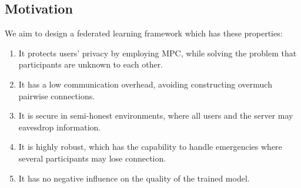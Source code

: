 
\subsection{Motivation} We aim to design a federated learning framework which has these properties:
\begin{enumerate}
    \item It protects users' privacy by employing MPC, while solving the problem that participants are unknown to each other.

    \item It has a low communication overhead, avoiding constructing overmuch pairwise connections.

    \item It is secure in semi-honest environments, where all users and the server may eavesdrop information.

    \item It is highly robust, which has the capability to handle emergencies where several participants may lose connection.

    \item It has no negative influence on the quality of the trained model.
\end{enumerate}

